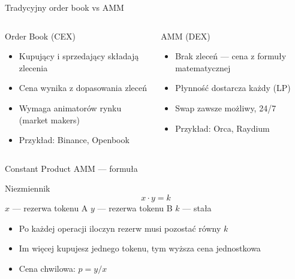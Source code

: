 \begin{frame}{Tradycyjny order book vs AMM}
  \begin{columns}
      \begin{block}{Order Book (CEX)}
        \begin{itemize}
          \item Kupujący i sprzedający składają zlecenia
          \item Cena wynika z dopasowania zleceń
          \item Wymaga animatorów rynku (market makers)
          \item Przykład: Binance, Openbook
        \end{itemize}
      \end{block}

      \begin{block}{AMM (DEX)}
        \begin{itemize}
          \item Brak zleceń --- cena z formuły matematycznej
          \item Płynność dostarcza każdy (LP)
          \item Swap zawsze możliwy, 24/7
          \item Przykład: Orca, Raydium
        \end{itemize}
      \end{block}
  \end{columns}
\end{frame}

\begin{frame}{Constant Product AMM --- formuła}
  \begin{block}{Niezmiennik}
    \[
      x \cdot y = k
    \]
    $x$ --- rezerwa tokenu A \quad $y$ --- rezerwa tokenu B \quad $k$ --- stała
  \end{block}
  \vspace{0.3cm}
  \begin{itemize}
    \item Po każdej operacji iloczyn rezerw musi pozostać równy $k$
    \item Im więcej kupujesz jednego tokenu, tym wyższa cena jednostkowa
    \item Cena chwilowa: $p = y / x$
  \end{itemize}
\end{frame}

